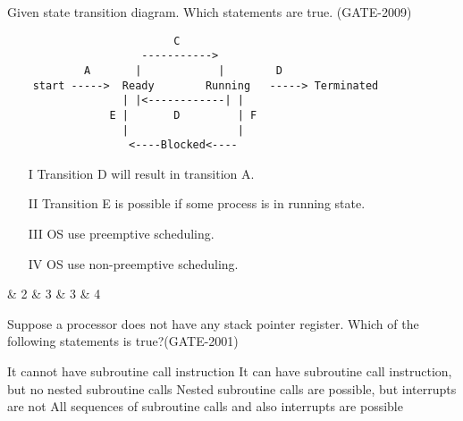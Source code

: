 
\begin{questyle}

  \question  Given state transition diagram. Which statements are true. (GATE-2009)
  \begin{lstlisting}
                          C
                     ----------->
            A       |            |        D
    start ----->  Ready        Running   -----> Terminated
                  | |<------------| |
                E |       D         | F
                  |                 |
                   <----Blocked<----
  \end{lstlisting}


  \begin{enumerate}
      \item[I] Transition D will result in transition A.
      \item[II] Transition E is possible if some process is in running state.
      \item[III] OS use preemptive scheduling.
      \item[IV] OS use non-preemptive scheduling.
   \end{enumerate}

  \begin{oneparchoices}
     \& 2
     \& 3
     \& 3
     \& 4
  \end{oneparchoices}

\end{questyle}




\begin{questyle}

  \question  Suppose a processor does not have any stack pointer register. Which of the following statements is true?(GATE-2001)

  \begin{choices}
    \CorrectChoice It cannot have subroutine call instruction
    \choice It can have subroutine call instruction, but no nested subroutine calls
    \choice Nested subroutine calls are possible, but interrupts are not
    \choice All sequences of subroutine calls and also interrupts are possible
  \end{choices}

  \end{questyle}



